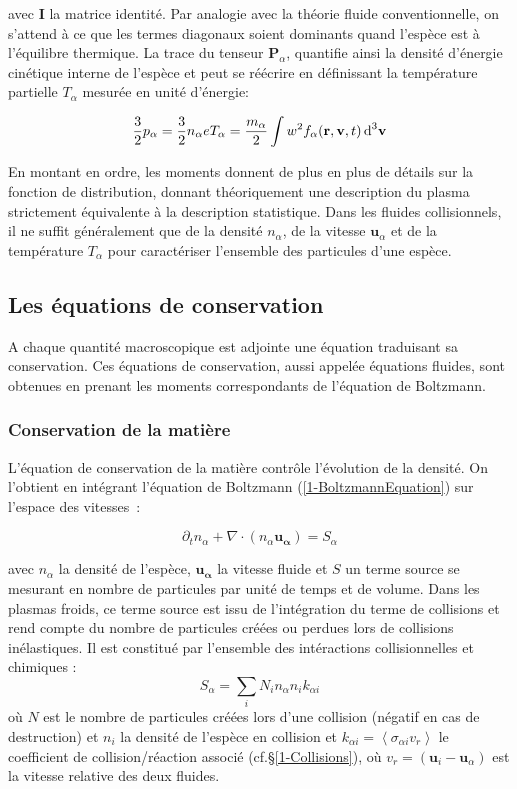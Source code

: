 \begin{refsection}
avec $\mathbf I$ la matrice identité. Par analogie avec la théorie fluide
conventionnelle, on s'attend à ce que les termes diagonaux soient dominants
quand l'espèce est à l'équilibre thermique. La trace du tenseur
$\mathbf P_\alpha$, quantifie ainsi la densité d'énergie cinétique
interne de l'espèce et peut se réécrire en définissant la température partielle 
$T_\alpha$ mesurée en unité d'énergie:

\begin{equation}
\frac{3}{2}p_\alpha=\frac{3}{2}n_\alpha eT_\alpha=\frac{m_\alpha}{2}\int 
w^{{2}} f_\alpha(\mathbf r,\mathbf v,t) \,\text{d}^{{3}}\mathbf{v}
\end{equation}

En montant en ordre, les moments donnent de plus en plus de détails sur la
fonction de distribution, donnant théoriquement une description du plasma
strictement équivalente à la description statistique. Dans les fluides
collisionnels, il ne suffit généralement que de la densité $n_\alpha$, de la
vitesse $\mathbf{u}_\alpha$ et de la température $T_\alpha$ pour caractériser
l'ensemble des particules d'une espèce.



\subsection{Les équations de conservation}

A chaque quantité macroscopique est adjointe une équation traduisant sa
conservation. Ces équations de conservation, aussi appelée équations fluides,
sont obtenues en prenant les moments correspondants de l'équation de Boltzmann.

\subsubsection{Conservation de la matière}
L'équation de conservation de la matière contrôle
l'évolution de la densité. On l'obtient en intégrant
l'équation de Boltzmann (\eqref{1-BoltzmannEquation}) sur l'espace des
vitesses~:

\begin{equation}
\label{1-eqContinuite}
	\partial_tn_\alpha+
	\nabla\cdot\left(n_\alpha\mathbf{u_\alpha}\right)=S_\alpha
\end{equation}

avec $n_\alpha$ la densité de l'espèce, $\mathbf{u_\alpha}$ la vitesse
fluide et $S$ un terme source se mesurant en nombre de particules par
unité de temps et de volume. Dans les plasmas froids, ce terme source est issu
de l'intégration du terme de collisions et rend compte du nombre de particules
créées ou perdues lors de collisions inélastiques. Il est constitué
par l'ensemble des intéractions collisionnelles et chimiques :
$$S_\alpha=\sum_i N_i n_{\alpha}n_{i}k_{\alpha i}$$ où $N$ est le nombre de
particules créées lors d'une collision (négatif en cas de destruction) et $n_i$ la
densité de l'espèce en collision et $k_{\alpha i}=\left<\sigma_{\alpha i}
v_r\right>$ le coefficient de collision/réaction
associé (cf.\S\ref{1-Collisions}), où $v_r=(\mathbf u_i-\mathbf u_\alpha)$ est
la vitesse relative des deux fluides.


\end{refsection}
